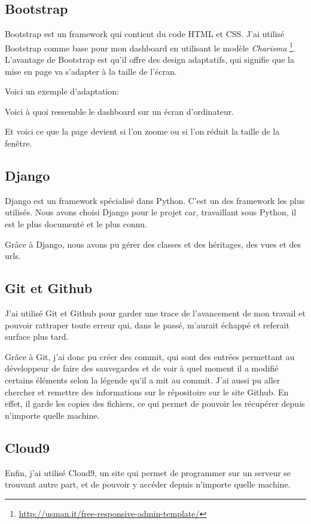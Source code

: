 \documentclass[letterpaper,10pt,french]{sphinxmanual}
\begin{document}
\subsection{Bootstrap}
\label{documentation:bootstrap}
Bootstrap est un framework qui contient du code HTML et CSS. J'ai utilisé
Bootstrap comme base pour mon dashboard en utilisant le modèle \emph{Charisma}
\footnote{
\href{http://usman.it/free-responsive-admin-template/}{http://usman.it/free-responsive-admin-template/}
}. L'avantage de Bootstrap est qu'il offre des
design adaptatifs, qui signifie que la mise en page va s'adapter à la taille de
l'écran.

Voici un exemple d'adaptation:

Voici à quoi ressemble le dashboard sur un écran d'ordinateur.

Et voici ce que la page devient si l'on zoome ou si l'on réduit la taille de la
fenêtre.


\subsection{Django}
\label{documentation:django}
Django est un framework spécialisé dans Python. C'est un des framework les plus
utilisés. Nous avons choisi Django pour le projet car, travaillant sous Python,
il est le plus documenté et le plus connu.

Grâce à Django, nous avons pu gérer des classes et des héritages, des vues et
des urls.


\subsection{Git et Github}
\label{documentation:git-et-github}
J'ai utilisé Git et Github pour garder une trace de l'avancement de mon travail
et pouvoir rattraper toute erreur qui, dans le passé, m'aurait échappé et
referait surface plus tard.

Grâce à Git, j'ai donc pu créer des commit, qui sont
des entrées permettant au développeur de faire des sauvegardes et de voir à quel
moment il a modifié certains éléments selon la légende qu'il a mit au commit.
J'ai aussi pu aller chercher et remettre des informations sur le répositoire
sur le site Github. En effet, il garde les copies des fichiers, ce qui permet
de pouvoir les récupérer depuis n'importe quelle machine.


\subsection{Cloud9}
\label{documentation:cloud9}
Enfin, j'ai utilisé Cloud9, un site qui permet de programmer sur un serveur
se trouvant autre part, et de pouvoir y accéder depuis n'importe quelle machine.
\end{document}

